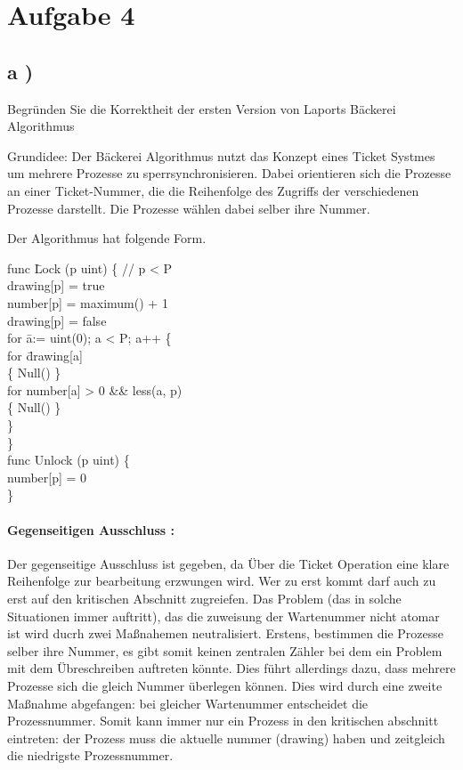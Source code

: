 \section*{Aufgabe 4}

\subsection*{  a ) }

Begründen Sie die Korrektheit der ersten Version von Laports Bäckerei Algorithmus

Grundidee: Der Bäckerei Algorithmus nutzt das Konzept eines Ticket Systmes um mehrere Prozesse zu sperrsynchronisieren. Dabei orientieren sich die Prozesse an einer Ticket-Nummer, die die Reihenfolge des Zugriffs der verschiedenen Prozesse darstellt. Die Prozesse wählen dabei selber ihre Nummer.

Der Algorithmus hat folgende Form.

\begin{mylisting}
\begin{tabbing}

func \= Lock (p uint) \{ // p < P \\
\>	drawing[p] = true \\
\>	number[p] = maximum() + 1 \\
\>	drawing[p] = false \\
\>	for \= a:= uint(0); a < P; a++ \{ \\
\>	\>	for \= drawing[a]  \\
\>	\>	\>	\{ Null() \} \\
\>	\>	for number[a] > 0 \&\& less(a, p)  \\
\>	\>	\>	\{ Null() \} \\
\>	\} \\
\} \\

func Unlock (p uint) \{ \\
\>	number[p] = 0 \\
\} \\

\end{tabbing}
\end{mylisting}

\paragraph{ Gegenseitigen Ausschluss : } Der gegenseitige Ausschluss ist gegeben, da Über die Ticket Operation eine klare Reihenfolge zur bearbeitung erzwungen wird. Wer zu erst kommt darf auch zu erst auf den kritischen Abschnitt zugreiefen. Das Problem (das in solche Situationen immer auftritt), das die zuweisung der Wartenummer nicht atomar ist wird ducrh zwei Maßnahemen neutralisiert. Erstens, bestimmen die Prozesse selber ihre Nummer, es gibt somit keinen zentralen Zähler bei dem ein Problem mit dem Übreschreiben auftreten könnte. Dies führt allerdings dazu, dass mehrere Prozesse sich die gleich Nummer überlegen können. Dies wird durch eine zweite Maßnahme abgefangen: bei gleicher Wartenummer entscheidet die Prozessnummer. Somit kann immer nur ein Prozess in den kritischen abschnitt eintreten: der Prozess muss die aktuelle nummer (drawing) haben und zeitgleich die niedrigste Prozessnummer.

